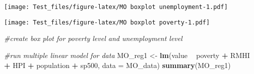\documentclass[
]{article}
\newenvironment{Shaded}{\begin{snugshade}}{\end{snugshade}}
\newcommand{\CommentTok}[1]{\textcolor[rgb]{0.56,0.35,0.01}{\textit{#1}}}
\newcommand{\DataTypeTok}[1]{\textcolor[rgb]{0.13,0.29,0.53}{#1}}
\newcommand{\DecValTok}[1]{\textcolor[rgb]{0.00,0.00,0.81}{#1}}
\newcommand{\KeywordTok}[1]{\textcolor[rgb]{0.13,0.29,0.53}{\textbf{#1}}}
\newcommand{\NormalTok}[1]{#1}
\newcommand{\OperatorTok}[1]{\textcolor[rgb]{0.81,0.36,0.00}{\textbf{#1}}}
\newcommand{\StringTok}[1]{\textcolor[rgb]{0.31,0.60,0.02}{#1}}
\begin{document}
\begin{Shaded}
\end{Shaded}

\texttt{[image: Test\_files/figure-latex/MO boxplot unemployment-1.pdf]}

\begin{Shaded}
\end{Shaded}

\texttt{[image: Test\_files/figure-latex/MO boxplot poverty-1.pdf]}

\begin{Shaded}
\begin{Highlighting}[]
\CommentTok{#create box plot for poverty level and unemployment level}
\end{Highlighting}
\end{Shaded}

\begin{Shaded}
\begin{Highlighting}[]
\CommentTok{#run multiple linear model for data}
\NormalTok{MO_reg1 <-}\StringTok{ }\KeywordTok{lm}\NormalTok{(value }\OperatorTok{~}\StringTok{ }\NormalTok{poverty }\OperatorTok{+}\StringTok{ }\NormalTok{RMHI }\OperatorTok{+}\StringTok{ }\NormalTok{HPI }\OperatorTok{+}\StringTok{ }\NormalTok{population }\OperatorTok{+}\StringTok{ }\NormalTok{sp500, }\DataTypeTok{data =}\NormalTok{ MO_data)}
\KeywordTok{summary}\NormalTok{(MO_reg1)}
\end{Highlighting}
\end{Shaded}
\end{document}
